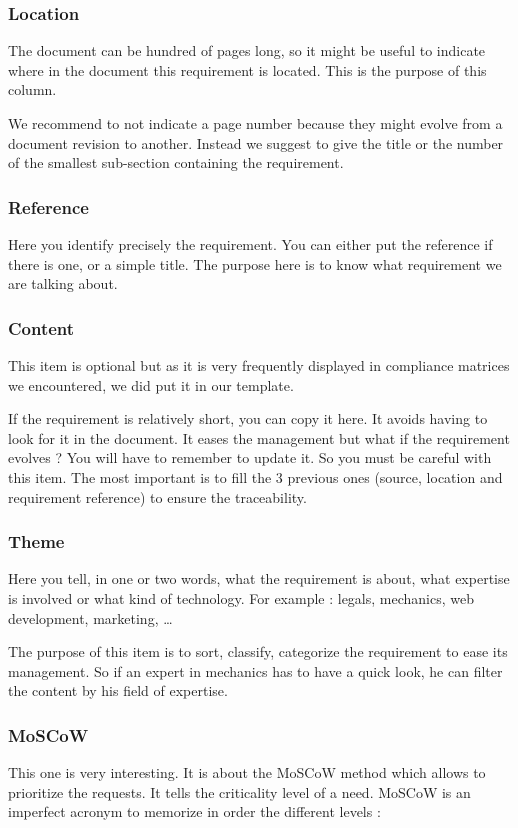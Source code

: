 \subsubsection{Location}
The document can be hundred of pages long, so it might be useful to indicate where in the document this requirement is located. This is the purpose of this column.

We recommend to not indicate a page number because they might evolve from a document revision to another. Instead we suggest to give the title or the number of the smallest sub-section containing the requirement.

\subsubsection{Reference}
Here you identify precisely the requirement. You can either put the reference if there is one, or a simple title. The purpose here is to know what requirement we are talking about.

\subsubsection{Content}
This item is optional but as it is very frequently displayed in compliance matrices we encountered, we did put it in our template.

If the requirement is relatively short, you can copy it here. It avoids having to look for it in the document. It eases the management but what if the requirement evolves ? You will have to remember to update it. So you must be careful with this item. The most important is to fill the 3 previous ones (source, location and requirement reference) to ensure the traceability.

\subsubsection{Theme}
Here you tell, in one or two words, what the requirement is about, what expertise is involved or what kind of technology. For example : legals, mechanics, web development, marketing, …

The purpose of this item is to sort, classify, categorize the requirement to ease its management. So if an expert in mechanics has to have a quick look, he can filter the content by his field of expertise.

\subsubsection{MoSCoW}
This one is very interesting. It is about the MoSCoW method which allows to prioritize the requests. It tells the criticality level of a need. MoSCoW is an imperfect acronym to memorize in order the different levels :

